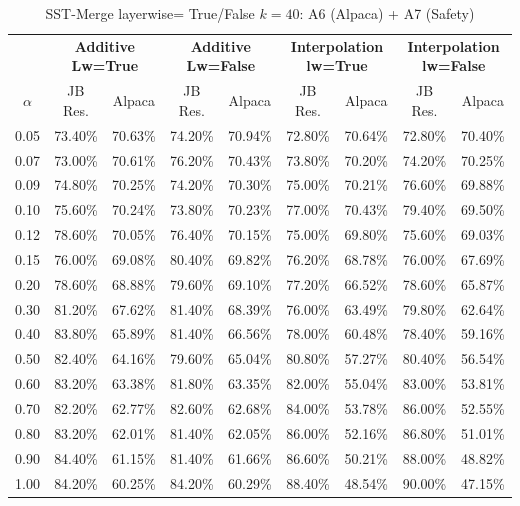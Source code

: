\begin{table}[h]
\centering
\caption{SST-Merge layerwise= True/False $k=40$: A6 (Alpaca) + A7 (Safety)}
\label{tab:res_a6_a7_sst_40}
\begin{tabular}{c|cc|cc|cc|cc}
\hline
 & \multicolumn{2}{c|}{\textbf{Additive Lw=True}} & \multicolumn{2}{c|}{\textbf{Additive Lw=False}} & \multicolumn{2}{c|}{\textbf{Interpolation lw=True}}& \multicolumn{2}{c}{\textbf{Interpolation lw=False}} \\
$\alpha$ & JB Res. & Alpaca & JB Res. & Alpaca & JB Res. & Alpaca & JB Res. & Alpaca \\
\hline
0.05 & 73.40\% & 70.63\% & 74.20\% & 70.94\% & 72.80\% & 70.64\% & 72.80\% & 70.40\% \\
0.07 & 73.00\% & 70.61\% & 76.20\% & 70.43\% & 73.80\% & 70.20\% & 74.20\% & 70.25\% \\
0.09 & 74.80\% & 70.25\% & 74.20\% & 70.30\% & 75.00\% & 70.21\% & 76.60\% & 69.88\% \\
0.10 & 75.60\% & 70.24\% & 73.80\% & 70.23\% & 77.00\% & 70.43\% & 79.40\% & 69.50\% \\
0.12 & 78.60\% & 70.05\% & 76.40\% & 70.15\% & 75.00\% & 69.80\% & 75.60\% & 69.03\% \\
0.15 & 76.00\% & 69.08\% & 80.40\% & 69.82\% & 76.20\% & 68.78\% & 76.00\% & 67.69\% \\
0.20 & 78.60\% & 68.88\% & 79.60\% & 69.10\% & 77.20\% & 66.52\% & 78.60\% & 65.87\% \\
0.30 & 81.20\% & 67.62\% & 81.40\% & 68.39\% & 76.00\% & 63.49\% & 79.80\% & 62.64\% \\
0.40 & 83.80\% & 65.89\% & 81.40\% & 66.56\% & 78.00\% & 60.48\% & 78.40\% & 59.16\% \\
0.50 & 82.40\% & 64.16\% & 79.60\% & 65.04\% & 80.80\% & 57.27\% & 80.40\% & 56.54\% \\
0.60 & 83.20\% & 63.38\% & 81.80\% & 63.35\% & 82.00\% & 55.04\% & 83.00\% & 53.81\% \\
0.70 & 82.20\% & 62.77\% & 82.60\% & 62.68\% & 84.00\% & 53.78\% & 86.00\% & 52.55\% \\
0.80 & 83.20\% & 62.01\% & 81.40\% & 62.05\% & 86.00\% & 52.16\% & 86.80\% & 51.01\% \\
0.90 & 84.40\% & 61.15\% & 81.40\% & 61.66\% & 86.60\% & 50.21\% & 88.00\% & 48.82\% \\
1.00 & 84.20\% & 60.25\% & 84.20\% & 60.29\% & 88.40\% & 48.54\% & 90.00\% & 47.15\% \\
\hline
\end{tabular}
\end{table}
\FloatBarrier

